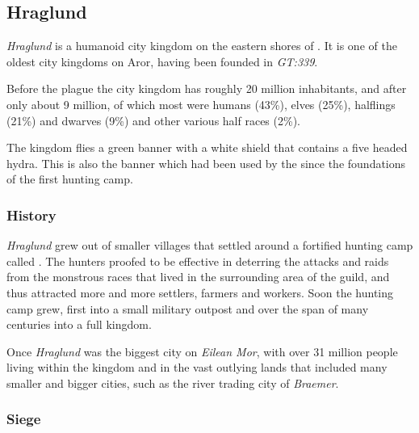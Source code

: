 \subsection{Hraglund}
\label{sec:Hraglund}

\emph{Hraglund} is a humanoid city kingdom on the eastern shores of
. It is one of the oldest city kingdoms on Aror,
having been founded in \emph{GT:339}.

Before the plague the city kingdom has roughly 20 million inhabitants, and
after only about 9 million, of which most were humans (43\%), elves (25\%),
halflings (21\%) and dwarves (9\%) and other various half races (2\%).

The kingdom flies a green banner with a white shield that contains a five
headed hydra. This is also the banner which had been used by the
 since the foundations of the first hunting camp.

\subsubsection{History}

\emph{Hraglund} grew out of smaller villages that settled around a fortified
hunting camp called . The hunters proofed to be
effective in deterring the attacks and raids from the monstrous races that
lived in the surrounding area of the guild, and thus attracted more and more
settlers, farmers and workers. Soon the hunting camp grew, first into a small
military outpost and over the span of many centuries into a full kingdom.

Once \emph{Hraglund} was the biggest city on \emph{Eilean Mor}, with over
31 million people living within the kingdom and in the vast outlying lands
that included many smaller and bigger cities, such as the river trading city
of \emph{Braemer}.

\subsubsection{Siege}
\label{sec:Siege of Hraglund}

